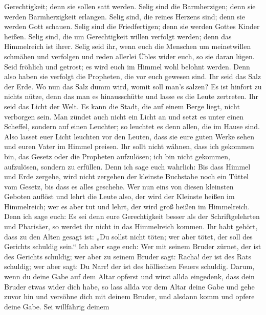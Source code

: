 Gerechtigkeit; denn sie sollen satt werden.  Selig sind die
Barmherzigen; denn sie werden Barmherzigkeit erlangen. 
Selig sind, die reines Herzens sind; denn sie werden Gott schauen.
 Selig sind die Friedfertigen; denn sie werden Gottes Kinder
heißen.  Selig sind, die um Gerechtigkeit willen verfolgt
werden; denn das Himmelreich ist ihrer.  Selig seid ihr,
wenn euch die Menschen um meinetwillen schmähen und verfolgen und reden
allerlei Übles wider euch, so sie daran lügen.  Seid
fröhlich und getrost; es wird euch im Himmel wohl belohnt werden. Denn
also haben sie verfolgt die Propheten, die vor euch gewesen sind.
 Ihr seid das Salz der Erde. Wo nun das Salz dumm wird,
womit soll man's salzen? Es ist hinfort zu nichts nütze, denn das man es
hinausschütte und lasse es die Leute zertreten.  Ihr seid
das Licht der Welt. Es kann die Stadt, die auf einem Berge liegt, nicht
verborgen sein.  Man zündet auch nicht ein Licht an und
setzt es unter einen Scheffel, sondern auf einen Leuchter; so leuchtet
es denn allen, die im Hause sind.  Also lasset euer Licht
leuchten vor den Leuten, dass sie eure guten Werke sehen und euren Vater
im Himmel preisen.  Ihr sollt nicht wähnen, dass ich
gekommen bin, das Gesetz oder die Propheten aufzulösen; ich bin nicht
gekommen, aufzulösen, sondern zu erfüllen.  Denn ich sage
euch wahrlich: Bis dass Himmel und Erde zergehe, wird nicht zergehen der
kleinste Buchstabe noch ein Tüttel vom Gesetz, bis dass es alles
geschehe.  Wer nun eins von diesen kleinsten Geboten
auflöst und lehrt die Leute also, der wird der Kleinste heißen im
Himmelreich; wer es aber tut und lehrt, der wird groß heißen im
Himmelreich.  Denn ich sage euch: Es sei denn eure
Gerechtigkeit besser als der Schriftgelehrten und Pharisäer, so werdet
ihr nicht in das Himmelreich kommen.  Ihr habt gehört, dass
zu den Alten gesagt ist: „Du sollst nicht töten; wer aber tötet, der
soll des Gerichts schuldig sein.``  Ich aber sage euch: Wer
mit seinem Bruder zürnet, der ist des Gerichts schuldig; wer aber zu
seinem Bruder sagt: Racha! der ist des Rats schuldig; wer aber sagt: Du
Narr! der ist des höllischen Feuers schuldig.  Darum, wenn
du deine Gabe auf dem Altar opferst und wirst allda eingedenk, dass dein
Bruder etwas wider dich habe,  so lass allda vor dem Altar
deine Gabe und gehe zuvor hin und versöhne dich mit deinem Bruder, und
alsdann komm und opfere deine Gabe.  Sei willfährig deinem
